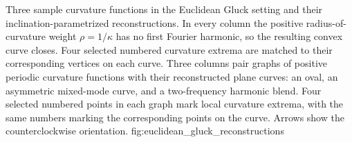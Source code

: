   {Three sample curvature functions in the Euclidean Gluck setting and their
   inclination-parametrized reconstructions. In every column the positive
   radius-of-curvature weight $\rho=1/\kappa$ has no first Fourier harmonic, so
   the resulting convex curve closes. Four selected numbered curvature extrema are
   matched to their corresponding vertices on each curve.}
  {Three columns pair graphs of positive periodic curvature functions with their
   reconstructed plane curves: an oval, an asymmetric mixed-mode curve, and a
   two-frequency harmonic blend. Four selected numbered points in each graph mark local
   curvature extrema, with the same numbers marking the corresponding points on
   the curve. Arrows show the counterclockwise orientation.}
  {fig:euclidean_gluck_reconstructions}


